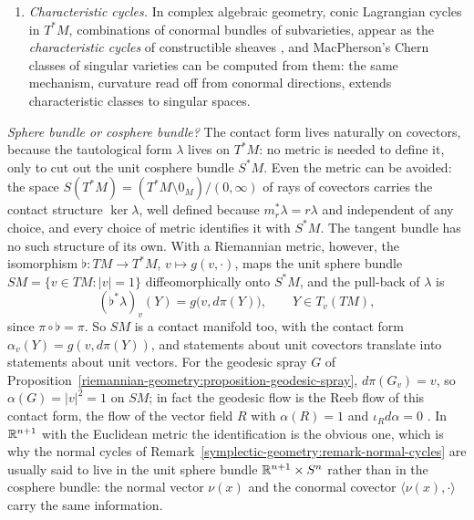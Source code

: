 \begin{remark}
\begin{enumerate}
$N(A \cup B) + N(A \cap B) = N(A) + N(B)$ when all four are defined, so the curvature integrals, the Euler characteristic among them, are additive functions of sets: this is the starting point of integral geometry.
\item \emph{Characteristic cycles.} In complex algebraic geometry, conic Lagrangian cycles in $T^*M$, combinations of conormal bundles of subvarieties, appear as the \emph{characteristic cycles} of constructible
sheaves \cite[Chapter IX]{ks-sheaves-manifolds}, and MacPherson's Chern classes of singular varieties \cite{macpherson-1974} can be computed from them: the same mechanism, curvature read off from conormal
directions, extends characteristic classes to singular spaces.
\end{enumerate}
\end{remark}

\begin{remark}\label{symplectic-geometry:remark-sphere-cosphere}
\emph{Sphere bundle or cosphere bundle?} The contact form lives naturally on covectors, because the tautological form $\lambda$ lives on $T^*M$: no metric is needed to define it, only to cut out the unit cosphere
bundle $S^*M$. Even the metric can be avoided: the space $S(T^*M) = (T^*M \setminus 0_M)/(0, \infty)$ of rays of covectors carries the contact structure $\ker\lambda$, well defined because $m_r^*\lambda = r\lambda$ and
independent of any choice, and every choice of metric identifies it with $S^*M$. The tangent bundle has no such structure of its own. With a Riemannian metric, however, the isomorphism
$\flat \colon TM \to T^*M$, $v \mapsto g(v, \cdot)$, maps the unit sphere bundle $SM = \{v \in TM : |v| = 1\}$ diffeomorphically onto $S^*M$, and the pull-back of $\lambda$ is
\[
(\flat^*\lambda)_v(Y) = g\bigl(v, d\pi(Y)\bigr), \qquad Y \in T_v(TM),
\]
since $\pi \circ \flat = \pi$. So $SM$ is a contact manifold too, with the contact form $\alpha_v(Y) = g(v, d\pi(Y))$, and statements about unit covectors translate into statements about unit vectors. For the
geodesic spray $G$ of Proposition~\ref{riemannian-geometry:proposition-geodesic-spray}, $d\pi(G_v) = v$, so $\alpha(G) = |v|^2 = 1$ on $SM$; in fact the geodesic flow is the Reeb flow of this contact form, the flow of
the vector field $R$ with $\alpha(R) = 1$ and $\iota_Rd\alpha = 0$ \cite{mcduff-salamon}. In $\mathbb{R}^{n+1}$ with the Euclidean metric the identification is the obvious one, which is why the normal cycles of
Remark~\ref{symplectic-geometry:remark-normal-cycles} are usually said to live in the unit sphere bundle $\mathbb{R}^{n+1} \times S^n$ rather than in the cosphere bundle: the normal vector $\nu(x)$ and the conormal covector
$\langle\nu(x), \cdot\rangle$ carry the same information.
\end{remark}


